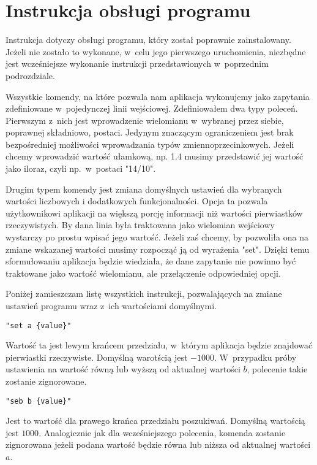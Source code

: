 \section{Instrukcja obsługi programu}

Instrukcja dotyczy obsługi programu, który został poprawnie zainstalowany. Jeżeli nie zostało to wykonane, w~celu jego pierwszego uruchomienia, niezbędne jest wcześniejsze wykonanie instrukcji przedstawionych w~poprzednim podrozdziale.

Wszystkie komendy, na które pozwala nam aplikacja wykonujemy jako zapytania zdefiniowane w~pojedynczej linii wejściowej. Zdefiniowałem dwa typy poleceń. Pierwszym z~nich jest wprowadzenie wielomianu w~wybranej przez siebie, poprawnej składniowo, postaci. Jedynym znaczącym ograniczeniem jest brak bezpośredniej możliwości wprowadzania typów zmiennoprzecinkowych. Jeżeli chcemy wprowadzić wartość ułamkową, np. 1.4 musimy przedstawić jej wartość jako iloraz, czyli np.\ w~postaci "14/10".

Drugim typem komendy jest zmiana domyślnych ustawień dla wybranych wartości liczbowych i dodatkowych funkcjonalności. Opcja ta pozwala użytkownikowi aplikacji na większą porcję informacji niż wartości pierwiastków rzeczywistych. By dana linia była traktowana jako wielomian wejściowy wystarczy po prostu wpisać jego wartość. Jeżeli zaś chcemy, by pozwoliła ona na zmiane wskazanej wartości musimy rozpocząć ją od wyrażenia "set". Dzięki temu sformułowaniu aplikacja będzie wiedziała, że dane zapytanie nie powinno być traktowane jako wartość wielomianu, ale przełączenie odpowiedniej opcji.

Poniżej zamieszczam listę wszystkich instrukcji, pozwalających na zmiane ustawień programu wraz z~ich wartościami domyślnymi.

\begin{lstlisting}
"set a {value}"
\end{lstlisting}

Wartość ta jest lewym krańcem przedziału, w~którym aplikacja będzie znajdować pierwiastki rzeczywiste. Domyślną warotścią jest $-1000$. W~przypadku próby ustawienia na wartość równą lub wyższą od aktualnej wartości $b$, polecenie takie zostanie zignorowane.

\begin{lstlisting}
"seb b {value}"
\end{lstlisting}

Jest to wartość dla prawego krańca przedziału poszukiwań. Domyślną wartością jest $1000$. Analogicznie jak dla wcześniejszego polecenia, komenda zostanie zignorowana jeżeli podana wartość będzie równa lub niższa od aktualnej wartości $a$.

